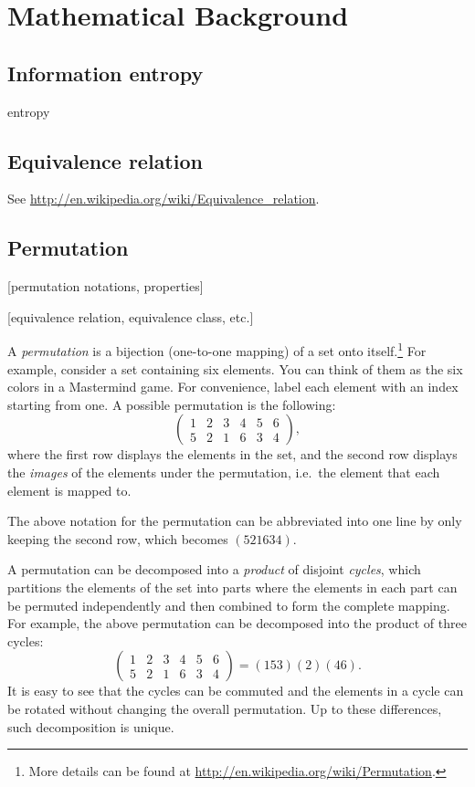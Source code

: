 \chapter{Mathematical Background}

\section{Information entropy}

entropy

\section{Equivalence relation}

See \url{http://en.wikipedia.org/wiki/Equivalence\_relation}.

\section{Permutation}

[permutation notations, properties]

[equivalence relation, equivalence class, etc.]

A \emph{permutation} is a bijection (one-to-one mapping) of a set onto itself.\footnote{
More details can be found at \url{http://en.wikipedia.org/wiki/Permutation}.}
For example, consider a set containing six elements. You can think of them as the six colors in a Mastermind game. For convenience, label each element with an index starting from one. A possible permutation is the following:
\[
\begin{pmatrix}
1 & 2 & 3 & 4 & 5 & 6 \\
5 & 2 & 1 & 6 & 3 & 4
\end{pmatrix} ,
\]
where the first row displays the elements in the set, and the second row displays the \emph{images} of the elements under the permutation, i.e.\ the element that each element is mapped to.

The above notation for the permutation can be abbreviated into one line by only keeping the second row, which becomes $(5 2 1 6 3 4)$.

A permutation can be decomposed into a \emph{product} of disjoint \emph{cycles}, which partitions the elements of the set into parts where the elements in each part can be permuted independently and then combined to form the complete mapping. For example, the above permutation can be decomposed into the product of three cycles:
\[
\begin{pmatrix}
1 & 2 & 3 & 4 & 5 & 6 \\
5 & 2 & 1 & 6 & 3 & 4
\end{pmatrix} 
= (1 5 3) (2) (4 6) .
\]
It is easy to see that the cycles can be commuted and the elements in a cycle can be rotated without changing the overall permutation. Up to these differences, such decomposition is unique.

